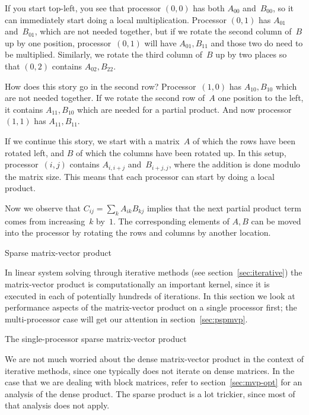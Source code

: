 If you start top-left, you see that processor $(0,0)$ has both
$A_{00}$ and~$B_{00}$, so it can immediately start doing a local multiplication.
Processor $(0,1)$ has $A_{01}$ and~$B_{01}$, which are
not needed together, but if we rotate the second column of~$B$ up
by one position, processor~$(0,1)$ will have $A_{01},B_{11}$ and those
two do need to be multiplied. Similarly, we rotate the third column of~$B$
up by two places so that $(0,2)$ contains $A_{02},B_{22}$.

How does this story go in the second row? Processor~$(1,0)$ has
$A_{10},B_{10}$ which are not needed together. If we rotate
the second row of~$A$ one position to the left, it contains
$A_{11},B_{10}$ which are needed for a partial product.
And now processor~$(1,1)$ has $A_{11},B_{11}$.

If we continue this story, we start with a matrix~$A$ of which the
rows have been rotated left, and $B$ of which the columns have been rotated up.
In this setup, processor~$(i,j)$ contains $A_{i,i+j}$ and~$B_{i+j,j}$,
where the addition is done modulo the matrix size. This means that
each processor can start by doing a local product.

Now we observe that $C_{ij}=\sum_kA_{ik}B_{kj}$ implies that
the next partial product term comes from increasing~$k$ by~$1$.
The corresponding elements of $A,B$ can be moved into the processor
by rotating the rows and columns by another location.


 {Sparse matrix-vector product}
\label{sec:pspmvp}

In linear system solving through iterative methods (see
section~\ref{sec:iterative}) the matrix-vector product is
computationally an important kernel, since it is executed in each of
potentially hundreds of iterations. In this section we look at
performance aspects of the matrix-vector product on a single
processor first; the multi-processor case will get our attention in
section~\ref{sec:pspmvp}.

 {The single-processor sparse matrix-vector product}
\label{sec:spmvp-performance}

We are not much worried about the dense matrix-vector product in the
context of iterative methods, since one typically does not iterate on
dense matrices. In the case that we are dealing with block matrices,
refer to section~\ref{sec:mvp-opt} for an analysis of the dense
product. The sparse product is a lot trickier, since most of that
analysis does not apply.

